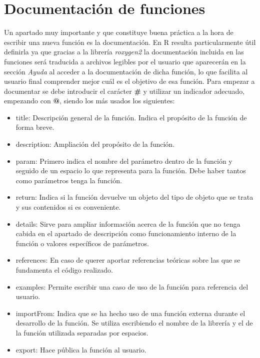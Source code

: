 \section{Documentación de funciones}
Un apartado muy importante y  que constituye buena práctica a la hora de escribir una nueva función es la documentación. En R resulta particularmente útil definirla ya que gracias a la librería \textit{roxygen2} \cite{Roxygen2} la documentación incluida en las funciones será traducida a archivos legibles por el usuario que aparecerán en la sección \textit{Ayuda} al acceder a la documentación de dicha función, lo que facilita al usuario final  comprender mejor cuál es el objetivo de esa función. Para empezar a documentar se debe introducir el carácter \textbf{\#\textquotesingle} y utilizar un indicador adecuado, empezando con \textbf{@}, siendo los más usados los siguientes:
\\
\begin{itemize}[label=$\bullet$]
    \item title: Descripción general de la función. Indica el propósito de la función de forma breve.
    \item description: Ampliación del propósito de la función.
    \item param: Primero indica el nombre del parámetro dentro de la función y seguido de un espacio lo que representa para la función. Debe haber tantos como parámetros tenga la función.
    \item return: Indica si la función devuelve un objeto del tipo de objeto que se trata y sus contenidos si es conveniente.
    \item details: Sirve para ampliar información acerca de la función que no tenga cabida en el apartado de descripción como funcionamiento interno de la función o valores específicos de parámetros.
    \item references: En caso de querer aportar referencias teóricas sobre las que se fundamenta el código realizado.
    \item examples: Permite escribir una caso de uso de la función para referencia del usuario.
    \item importFrom: Indica que se ha hecho uso de una función externa durante el desarrollo de la función. Se utiliza escribiendo el nombre de la librería y el de la función utilizada separadas por espacios.
    \item export: Hace pública la función al usuario.
    
\end{itemize}

